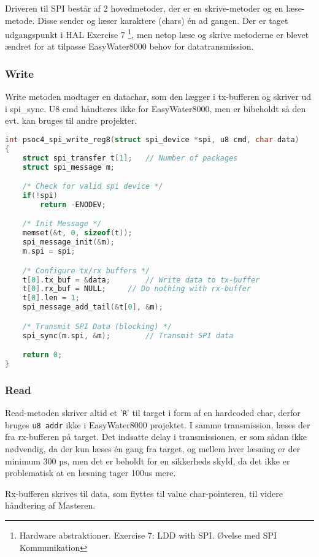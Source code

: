 
Driveren til SPI består af 2 hovedmetoder, der er en skrive-metoder og en læse-metode. Disse sender og læser karaktere (chars) én ad gangen. Der er taget udgangspunkt i HAL Exercise 7 \footnote{Hardware abstraktioner. Exercise 7: LDD with SPI. Øvelse med SPI Kommunikation}, men netop læse og skrive metoderne er blevet ændret for at tilpasse EasyWater8000 behov for datatransmission.

\subsubsection*{Write}

Write metoden modtager en datachar, som den lægger i tx-bufferen og skriver ud i spi\_sync. 
U8 cmd håndteres ikke for EasyWater8000, men er bibeholdt så den evt. kan bruges til andre projekter.

\begin{lstlisting}[language=C]
int psoc4_spi_write_reg8(struct spi_device *spi, u8 cmd, char data)
{
	struct spi_transfer t[1];	// Number of packages
	struct spi_message m;

	/* Check for valid spi device */
	if(!spi)
		return -ENODEV;

	/* Init Message */
	memset(&t, 0, sizeof(t)); 
	spi_message_init(&m);
	m.spi = spi;

	/* Configure tx/rx buffers */
	t[0].tx_buf = &data;		// Write data to tx-buffer
	t[0].rx_buf = NULL;		// Do nothing with rx-buffer
	t[0].len = 1;			
	spi_message_add_tail(&t[0], &m);

	/* Transmit SPI Data (blocking) */
	spi_sync(m.spi, &m);		// Transmit SPI data

	return 0;
}
\end{lstlisting}

\subsubsection*{Read}

Read-metoden skriver altid et '\verb+R+' til target i form af en hardcoded char, derfor bruges \verb+u8 addr+ ikke i EasyWater8000 projektet. I samme transmission, læses der fra rx-bufferen på target. Det indsatte delay i transmissionen, er som sådan ikke nødvendig, da der kun læses én gang fra target, og mellem hver læsning er der minimum 300 µs, men det er beholdt for en sikkerheds skyld, da det ikke er problematisk at en læsning tager 100us mere.

Rx-bufferen skrives til data, som flyttes til value char-pointeren, til videre håndtering af Masteren.

